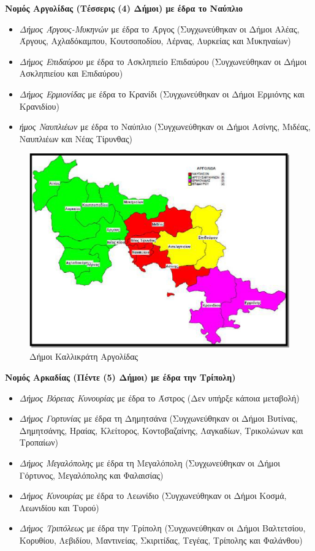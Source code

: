 \documentclass[12pt]{article}
\begin{document}
	\textbf{Νομός Αργολίδας (Τέσσερις (4) Δήμοι) με έδρα το Ναύπλιο}
	\begin{itemize}
		\item \emph{Δήμος Άργους-Μυκηνών} με έδρα το Άργος (Συγχωνεύθηκαν οι Δήμοι Αλέας, Άργους, Αχλαδόκαμπου, Κουτσοποδίου, Λέρνας, Λυρκείας και Μυκηναίων)
		\item \emph{Δήμος Επιδαύρου} με έδρα το Ασκληπιείο Επιδαύρου (Συγχωνεύθηκαν οι Δήμοι Ασκληπιείου και Επιδαύρου)
		\item \emph{Δήμος Ερμιονίδας} με έδρα το Κρανίδι (Συγχωνεύθηκαν οι Δήμοι Ερμιόνης και Κρανιδίου)
		\item \emph{ήμος Ναυπλιέων} με έδρα το Ναύπλιο (Συγχωνεύθηκαν οι Δήμοι Ασίνης, Μιδέας, Ναυπλιέων και Νέας Τίρυνθας)
	\end{itemize}

	\begin{figure} [H]
		\begin{center}
			\includegraphics [scale = 0.60] {argolida.png}
			\caption{Δήμοι Καλλικράτη Αργολίδας}
		\end{center}
	\end{figure}

	\textbf{Νομός Αρκαδίας (Πέντε (5) Δήμοι) με έδρα την Τρίπολη)}
	\begin{itemize}
		\item \emph{Δήμος Βόρειας Κυνουρίας} με έδρα το Άστρος (Δεν υπήρξε κάποια μεταβολή)
		\item \emph{Δήμος Γορτυνίας} με έδρα τη Δημητσάνα (Συγχωνεύθηκαν οι Δήμοι Βυτίνας, Δημητσάνης, Ηραίας, Κλείτορος, Κοντοβαζαίνης, Λαγκαδίων, Τρικολώνων και Τροπαίων)
		\item \emph{Δήμος Μεγαλόπολης} με έδρα τη Μεγαλόπολη (Συγχωνεύθηκαν οι Δήμοι Γόρτυνος, Μεγαλόπολης και Φαλαισίας)
		\item \emph{Δήμος Κυνουρίας} με έδρα το Λεωνίδιο (Συγχωνεύθηκαν οι Δήμοι Κοσμά, Λεωνιδίου και Τυρού)
		\item \emph{Δήμος Τριπόλεως} με έδρα την Τρίπολη (Συγχωνεύθηκαν οι Δήμοι Βαλτετσίου, Κορυθίου, Λεβιδίου, Μαντινείας, Σκιριτίδας, Τεγέας, Τρίπολης και Φαλάνθου)
	\end{itemize}
\end{document}
